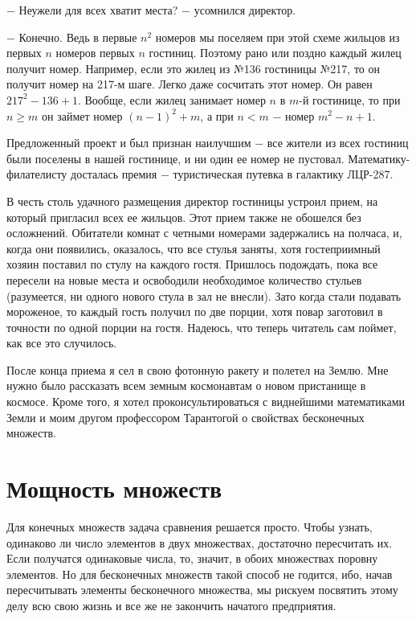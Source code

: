 \documentclass{article}
\begin{document}
\(-\) Неужели для всех хватит места? \(-\) усомнился директор.

\(-\) Конечно. Ведь в первые \(n^2\) номеров мы поселяем при этой схеме жильцов из первых \(n\) номеров первых \(n\) гостиниц. Поэтому рано или поздно каждый жилец получит номер. Например, если это жилец из №136 гостиницы №217, то он получит номер на 217-м шаге. Легко даже сосчитать этот номер. Он равен \(217^2 - 136 + 1\). Вообще, если жилец занимает номер \(n\) в \(m\)-й гостинице, то при \(n \geq m\) он займет номер \((n - 1)^2 + m\), а при \(n < m\) \(-\) номер \(m^2 - n + 1\).

Предложенный проект и был признан наилучшим \(-\) все жители из всех гостиниц были поселены в нашей гостинице, и ни один ее номер не пустовал. Математику-филателисту досталась премия \(-\) туристическая путевка в галактику ЛЦР-287.

В честь столь удачного размещения директор гостиницы устроил прием, на который пригласил всех ее жильцов. Этот прием также не обошелся без осложнений. Обитатели комнат с четными номерами задержались на полчаса, и, когда они появились, оказалось, что все стулья заняты, хотя гостеприимный хозяин поставил по стулу на каждого гостя. Пришлось подождать, пока все пересели на новые места и освободили необходимое количество стульев (разумеется, ни одного нового стула в зал не внесли). Зато когда стали подавать мороженое, то каждый гость получил по две порции, хотя повар заготовил в точности по одной порции на гостя. Надеюсь, что теперь читатель сам поймет, как все это случилось.

После конца приема я сел в свою фотонную ракету и полетел на Землю. Мне нужно было рассказать всем земным космонавтам о новом пристанище в космосе. Кроме того, я хотел проконсультироваться с виднейшими математиками Земли и моим другом профессором Тарантогой о свойствах бесконечных множеств.

\section{Мощность множеств}

Для конечных множеств задача сравнения решается просто. Чтобы узнать, одинаково ли число элементов в двух множествах, достаточно пересчитать их. Если получатся одинаковые числа, то, значит, в обоих множествах поровну элементов. Но для бесконечных множеств такой способ не годится, ибо, начав пересчитывать элементы бесконечного множества, мы рискуем посвятить этому делу всю свою жизнь и все же не закончить начатого предприятия.
\end{document}
